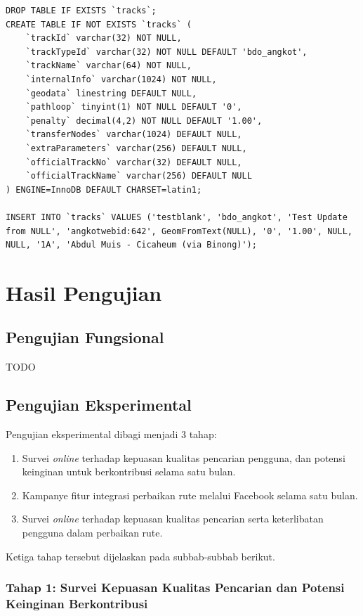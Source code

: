 \begin{lstlisting}
DROP TABLE IF EXISTS `tracks`;
CREATE TABLE IF NOT EXISTS `tracks` (
	`trackId` varchar(32) NOT NULL,
	`trackTypeId` varchar(32) NOT NULL DEFAULT 'bdo_angkot',
	`trackName` varchar(64) NOT NULL,
	`internalInfo` varchar(1024) NOT NULL,
	`geodata` linestring DEFAULT NULL,
	`pathloop` tinyint(1) NOT NULL DEFAULT '0',
	`penalty` decimal(4,2) NOT NULL DEFAULT '1.00',
	`transferNodes` varchar(1024) DEFAULT NULL,
	`extraParameters` varchar(256) DEFAULT NULL,
	`officialTrackNo` varchar(32) DEFAULT NULL,
	`officialTrackName` varchar(256) DEFAULT NULL
) ENGINE=InnoDB DEFAULT CHARSET=latin1;

INSERT INTO `tracks` VALUES ('testblank', 'bdo_angkot', 'Test Update from NULL', 'angkotwebid:642', GeomFromText(NULL), '0', '1.00', NULL, NULL, '1A', 'Abdul Muis - Cicaheum (via Binong)');
\end{lstlisting}

\section{Hasil Pengujian}

\subsection{Pengujian Fungsional}

TODO

\subsection{Pengujian Eksperimental}

Pengujian eksperimental dibagi menjadi 3 tahap:

\begin{enumerate}
	\item Survei \textit{online} terhadap kepuasan kualitas pencarian pengguna, dan potensi keinginan untuk berkontribusi selama satu bulan.
	\item Kampanye fitur integrasi perbaikan rute melalui Facebook selama satu bulan.
	\item Survei \textit{online} terhadap kepuasan kualitas pencarian serta keterlibatan pengguna dalam perbaikan rute.
\end{enumerate}

Ketiga tahap tersebut dijelaskan pada subbab-subbab berikut.

\subsubsection{Tahap 1: Survei Kepuasan Kualitas Pencarian dan Potensi Keinginan Berkontribusi}

